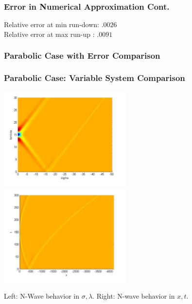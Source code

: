 \documentclass[xcolor=dvipsnames]{beamer}
\begin{document}
\begin{frame}
\frametitle{Error in Numerical Approximation Cont.}

Relative error at min run-down: $.0026$\\\vspace{5mm}
Relative error at max run-up : $.0091$\\\vspace{5mm}

\end{frame}

\begin{frame}
\frametitle{Parabolic Case with Error Comparison}
\begin{center}
\end{center}
\end{frame}

\begin{frame}
\frametitle{Parabolic Case: Variable System Comparison}
\begin{center}
\includegraphics[width=0.5\textwidth]{NonPhys.pdf}
\includegraphics[width=0.5\textwidth]{Phys.pdf}
\end{center}
Left: N-Wave behavior in $\sigma, \lambda$.  Right: N-wave behavior in $x, t$.


\end{frame}
\end{document}
